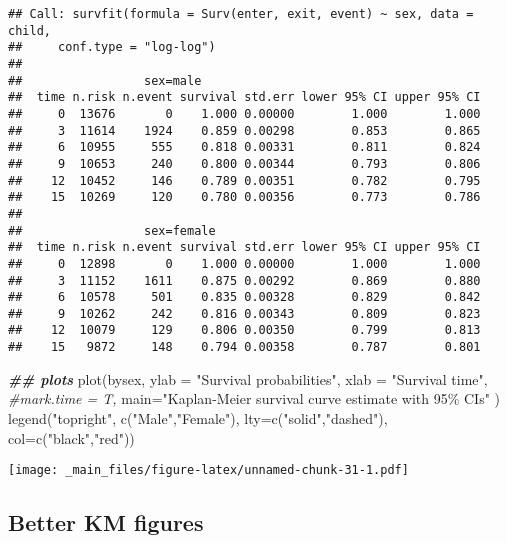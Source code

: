 \documentclass[
]{book}
\newenvironment{Shaded}{\begin{snugshade}}{\end{snugshade}}
\newcommand{\AttributeTok}[1]{\textcolor[rgb]{0.77,0.63,0.00}{#1}}
\newcommand{\CommentTok}[1]{\textcolor[rgb]{0.56,0.35,0.01}{\textit{#1}}}
\newcommand{\DocumentationTok}[1]{\textcolor[rgb]{0.56,0.35,0.01}{\textbf{\textit{#1}}}}
\newcommand{\FunctionTok}[1]{\textcolor[rgb]{0.00,0.00,0.00}{#1}}
\newcommand{\NormalTok}[1]{#1}
\newcommand{\StringTok}[1]{\textcolor[rgb]{0.31,0.60,0.02}{#1}}
\begin{document}
\begin{verbatim}
## Call: survfit(formula = Surv(enter, exit, event) ~ sex, data = child, 
##     conf.type = "log-log")
## 
##                 sex=male 
##  time n.risk n.event survival std.err lower 95% CI upper 95% CI
##     0  13676       0    1.000 0.00000        1.000        1.000
##     3  11614    1924    0.859 0.00298        0.853        0.865
##     6  10955     555    0.818 0.00331        0.811        0.824
##     9  10653     240    0.800 0.00344        0.793        0.806
##    12  10452     146    0.789 0.00351        0.782        0.795
##    15  10269     120    0.780 0.00356        0.773        0.786
## 
##                 sex=female 
##  time n.risk n.event survival std.err lower 95% CI upper 95% CI
##     0  12898       0    1.000 0.00000        1.000        1.000
##     3  11152    1611    0.875 0.00292        0.869        0.880
##     6  10578     501    0.835 0.00328        0.829        0.842
##     9  10262     242    0.816 0.00343        0.809        0.823
##    12  10079     129    0.806 0.00350        0.799        0.813
##    15   9872     148    0.794 0.00358        0.787        0.801
\end{verbatim}

\begin{Shaded}
\begin{Highlighting}[]
\DocumentationTok{\#\# plots}
\FunctionTok{plot}\NormalTok{(bysex,}
     \AttributeTok{ylab =} \StringTok{"Survival probabilities"}\NormalTok{,}
     \AttributeTok{xlab =} \StringTok{"Survival time"}\NormalTok{,}
     \CommentTok{\#mark.time = T,}
     \AttributeTok{main=}\StringTok{"Kaplan{-}Meier survival curve estimate with 95\% CIs"}
\NormalTok{     )}
\FunctionTok{legend}\NormalTok{(}\StringTok{"topright"}\NormalTok{, }\FunctionTok{c}\NormalTok{(}\StringTok{"Male"}\NormalTok{,}\StringTok{"Female"}\NormalTok{),}
\AttributeTok{lty=}\FunctionTok{c}\NormalTok{(}\StringTok{"solid"}\NormalTok{,}\StringTok{"dashed"}\NormalTok{), }\AttributeTok{col=}\FunctionTok{c}\NormalTok{(}\StringTok{"black"}\NormalTok{,}\StringTok{"red"}\NormalTok{))}
\end{Highlighting}
\end{Shaded}

\texttt{[image: \_main\_files/figure-latex/unnamed-chunk-31-1.pdf]}

\hypertarget{better-km-figures}{%
\subsection{Better KM figures}\label{better-km-figures}}
\end{document}
